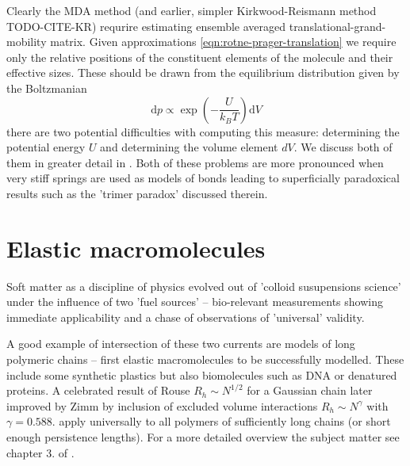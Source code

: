 \documentclass{doctoral}
\newcommand{\dd}{\mathrm{d}}
\begin{document}
Clearly the MDA method (and earlier, simpler Kirkwood-Reismann method TODO-CITE-KR) requrire estimating ensemble averaged translational-grand-mobility matrix. Given approximations \eqref{eqn:rotne-prager-translation} we require only the relative positions of the constituent elements of the molecule and their effective sizes. These should be drawn from the equilibrium distribution given by the Boltzmanian
\begin{equation}
    \dd p \propto \exp \left(- \frac{U}{k_B T} \right) \dd V
\end{equation}
there are two potential difficulties with computing this measure: determining the potential energy $U$ and determining the volume element $dV$. We discuss both of them in greater detail in \textcite{Waszkiewicz_2024_trimer}. Both of these problems are more pronounced when very stiff springs are used as models of bonds leading to superficially paradoxical results such as the 'trimer paradox' discussed therein.

\section{Elastic macromolecules}

Soft matter as a discipline of physics evolved out of 'colloid susupensions science' under the influence of two 'fuel sources' -- bio-relevant measurements showing immediate applicability and a chase of observations of 'universal' validity.

A good example of intersection of these two currents are models of long polymeric chains -- first elastic macromolecules to be successfully modelled. These include some synthetic plastics but also biomolecules such as DNA or denatured proteins. A celebrated result of Rouse $R_h \sim N^{1/2}$ for a Gaussian chain\cite{Rouse_1953} later improved by Zimm by inclusion of excluded volume interactions \cite{Zimm_1956} $R_h \sim N^\gamma$ with $\gamma=0.588$. apply universally to all polymers of sufficiently long chains (or short enough persistence lengths). For a more detailed overview the subject matter see chapter 3. of \textcite{Dhont_2008}.



\end{document}
